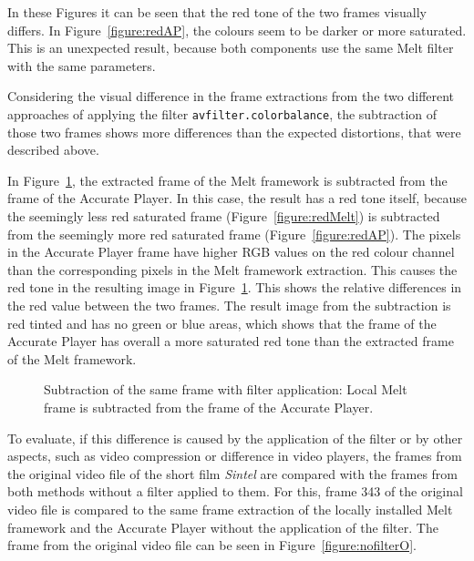 \documentclass[../MasterThesis.tex]{subfiles}
\begin{document}
\vspace*{1.5em}
In these Figures it can be seen that the red tone of the two frames visually differs. In Figure~\ref{figure:redAP}, the colours seem to be darker or more saturated. This is an unexpected result, because both components use the same Melt filter with the same parameters.


Considering the visual difference in the frame extractions from the two different approaches of applying the filter \texttt{avfilter.colorbalance}, the subtraction of those two frames shows more differences than the expected distortions, that were described above.

In Figure~\ref{figure:filterVSfilter}, the extracted frame of the Melt framework is subtracted from the frame of the Accurate Player.
In this case, the result has a red tone itself, because the seemingly less red saturated frame (Figure~\ref{figure:redMelt}) is subtracted from the seemingly more red saturated frame (Figure~\ref{figure:redAP}). The pixels in the Accurate Player frame have higher RGB values on the red colour channel than the corresponding pixels in the Melt framework extraction. This causes the red tone in the resulting image in Figure~\ref{figure:filterVSfilter}.
This shows the relative differences in the red value between the two frames. 
The result image from the subtraction is red tinted and has no green or blue areas, which shows that the frame of the Accurate Player has overall a more saturated red tone than the extracted frame of the Melt framework.


\begin{figure}[H]
	\begin{center}
		\caption[Subtraction of the two different frames (Accurate Player - Melt).]{Subtraction of the same frame with filter application: Local Melt frame is subtracted from the frame of the Accurate Player.}
		\label{figure:filterVSfilter}
	\end{center}
\end{figure}

To evaluate, if this difference is caused by the application of the filter or by other aspects, such as video compression or difference in video players, the frames from the original video file of the short film \textit{Sintel} are compared with the frames from both methods without a filter applied to them. For this, frame 343 of the original video file is compared to the same frame extraction of the locally installed Melt framework and the Accurate Player without the application of the filter. The frame from the original video file can be seen in Figure~\ref{figure:nofilterO}.
\end{document}
